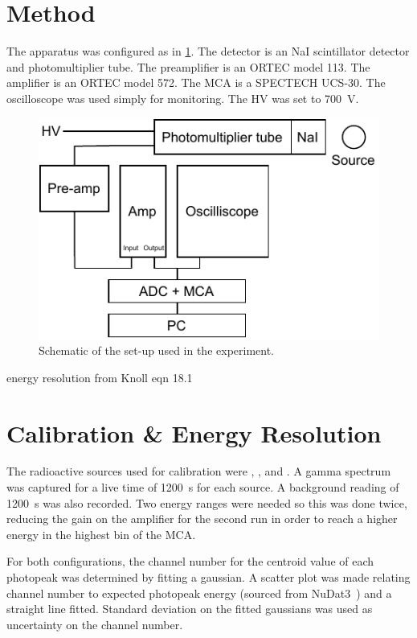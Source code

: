 \documentclass[11pt]{article}
\numberwithin{equation}{section}
\numberwithin{figure}{section}
\numberwithin{table}{section}
\begin{document}
\section{Method}\label{sec:Method}
The apparatus was configured as in \cref{fig:Apparatus}. The detector is an NaI scintillator detector and photomultiplier tube. The preamplifier is an ORTEC model 113. The amplifier is an ORTEC model 572. The MCA is a SPECTECH UCS-30. The oscilloscope was used simply for monitoring. The HV was set to \SI{700}{\volt}.

\begin{figure}[h]
    \begin{center}
        \includegraphics[width=.6\textwidth]{Plots/apparatus.pdf}
        \caption{Schematic of the set-up used in the experiment.}
        \label{fig:Apparatus}
    \end{center}
\end{figure}



energy resolution from Knoll eqn 18.1


\section{Calibration \& Energy Resolution}\label{sec:CalibrationResolution}
The radioactive sources used for calibration were , , and . A gamma spectrum was captured for a live time of \SI{1200}{\second} for each source. A background reading of \SI{1200}{\second} was also recorded. Two energy ranges were needed so this was done twice, reducing the gain on the amplifier for the second run in order to reach a higher energy in the highest bin of the MCA. 

For both configurations, the channel number for the centroid value of each photopeak was determined by fitting a gaussian. A scatter plot was made relating channel number to expected photopeak energy (sourced from NuDat3~\cite{nudat}) and a straight line fitted. Standard deviation on the fitted gaussians was used as uncertainty on the channel number. 
\end{document}
